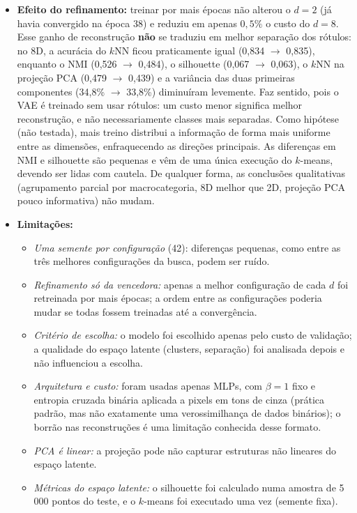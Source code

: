 \documentclass[11pt,a4paper]{article}
\begin{document}
\begin{itemize}
    \item \textbf{Efeito do refinamento:} treinar por mais épocas não alterou o $d=2$ (já havia convergido na época 38) e reduziu em apenas $0{,}5\%$ o custo do $d=8$. Esse ganho de reconstrução \textbf{não} se traduziu em melhor separação dos rótulos: no 8D, a acurácia do $k$NN ficou praticamente igual (0,834 $\to$ 0,835), enquanto o NMI (0,526 $\to$ 0,484), o silhouette (0,067 $\to$ 0,063), o $k$NN na projeção PCA (0,479 $\to$ 0,439) e a variância das duas primeiras componentes (34,8\% $\to$ 33,8\%) diminuíram levemente. Faz sentido, pois o VAE é treinado sem usar rótulos: um custo menor significa melhor reconstrução, e não necessariamente classes mais separadas. Como hipótese (não testada), mais treino distribui a informação de forma mais uniforme entre as dimensões, enfraquecendo as direções principais. As diferenças em NMI e silhouette são pequenas e vêm de uma única execução do $k$-means, devendo ser lidas com cautela. De qualquer forma, as conclusões qualitativas (agrupamento parcial por macrocategoria, 8D melhor que 2D, projeção PCA pouco informativa) não mudam.
    \item \textbf{Limitações:}
    \begin{itemize}
        \item \textit{Uma semente por configuração} (42): diferenças pequenas, como entre as três melhores configurações da busca, podem ser ruído.
        \item \textit{Refinamento só da vencedora:} apenas a melhor configuração de cada $d$ foi retreinada por mais épocas; a ordem entre as configurações poderia mudar se todas fossem treinadas até a convergência.
        \item \textit{Critério de escolha:} o modelo foi escolhido apenas pelo custo de validação; a qualidade do espaço latente (clusters, separação) foi analisada depois e não influenciou a escolha.
        \item \textit{Arquitetura e custo:} foram usadas apenas MLPs, com $\beta=1$ fixo e entropia cruzada binária aplicada a pixels em tons de cinza (prática padrão, mas não exatamente uma verossimilhança de dados binários); o borrão nas reconstruções é uma limitação conhecida desse formato.
        \item \textit{PCA é linear:} a projeção pode não capturar estruturas não lineares do espaço latente.
        \item \textit{Métricas do espaço latente:} o silhouette foi calculado numa amostra de 5\,000 pontos do teste, e o $k$-means foi executado uma vez (semente fixa).
    \end{itemize}
\end{itemize}
\end{document}
